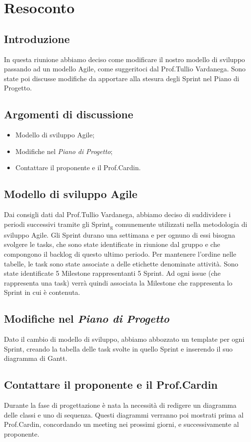 \section{Resoconto}
\subsection{Introduzione}
In questa riunione abbiamo deciso come modificare il nostro modello di sviluppo passando ad un modello Agile, come suggeritoci dal Prof.Tullio Vardanega. Sono state poi discusse modifiche da apportare alla stesura degli Sprint nel Piano di Progetto.
\subsection{Argomenti di discussione}
\begin{itemize}
    \item Modello di sviluppo Agile;
    \item Modifiche nel \textit{Piano di Progetto};
    \item Contattare il proponente e il Prof.Cardin.
\end{itemize}
\subsection{Modello di sviluppo Agile}
Dai consigli dati dal Prof.Tullio Vardanega, abbiamo deciso di suddividere i periodi successivi tramite gli Sprint\textsubscript{g} comunemente utilizzati nella metodologia di sviluppo Agile.
Gli Sprint durano una settimana e per ognuno di essi bisogna svolgere le tasks, che sono state identificate in riunione dal gruppo e che compongono il backlog di questo ultimo periodo.
Per mantenere l'ordine nelle tabelle, le task sono state associate a delle etichette denominate attività. 
Sono state identificate 5 Milestone rappresentanti 5 Sprint.
Ad ogni issue (che rappresenta una task) verrà quindi associata la Milestone che rappresenta lo Sprint in cui è contenuta. 

\subsection{Modifiche nel \textit{Piano di Progetto}}
Dato il cambio di modello di sviluppo, abbiamo abbozzato un template per ogni Sprint, creando la tabella delle task svolte in quello Sprint e inserendo il suo diagramma di Gantt.

\subsection{Contattare il proponente e il Prof.Cardin}
Durante la fase di progettazione è nata la necessità di redigere un diagramma delle classi e uno di sequenza. Questi diagrammi verranno poi mostrati prima al Prof.Cardin, concordando un meeting nei prossimi giorni, e successivamente al proponente.

